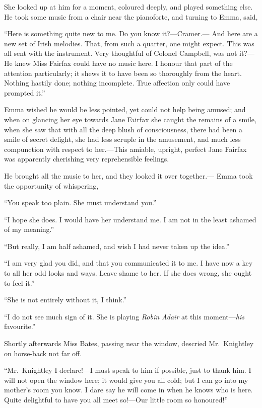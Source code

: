 She looked up at him for a moment, coloured deeply, and played
something else.  He took some music from a chair near the pianoforte,
and turning to Emma, said,

``Here is something quite new to me.  Do you know it?---Cramer.---%
And here are a new set of Irish melodies.  That, from such a quarter,
one might expect.  This was all sent with the instrument.  Very thoughtful
of Colonel Campbell, was not it?---He knew Miss Fairfax could have
no music here.  I honour that part of the attention particularly;
it shews it to have been so thoroughly from the heart.  Nothing hastily
done; nothing incomplete.  True affection only could have prompted it.''

Emma wished he would be less pointed, yet could not help being amused;
and when on glancing her eye towards Jane Fairfax she caught
the remains of a smile, when she saw that with all the deep blush
of consciousness, there had been a smile of secret delight,
she had less scruple in the amusement, and much less compunction
with respect to her.---This amiable, upright, perfect Jane Fairfax
was apparently cherishing very reprehensible feelings.

He brought all the music to her, and they looked it over together.---%
Emma took the opportunity of whispering,

``You speak too plain.  She must understand you.''

``I hope she does.  I would have her understand me.  I am not
in the least ashamed of my meaning.''

``But really, I am half ashamed, and wish I had never taken up
the idea.''

``I am very glad you did, and that you communicated it to me.
I have now a key to all her odd looks and ways.  Leave shame to her.
If she does wrong, she ought to feel it.''

``She is not entirely without it, I think.''

``I do not see much sign of it.  She is playing \emph{Robin Adair}
at this moment---\emph{his} favourite.''

Shortly afterwards Miss Bates, passing near the window,
descried Mr.\ Knightley on horse-back not far off.

``Mr.\ Knightley I declare!---I must speak to him if possible,
just to thank him.  I will not open the window here; it would give
you all cold; but I can go into my mother's room you know.  I dare
say he will come in when he knows who is here.  Quite delightful
to have you all meet so!---Our little room so honoured!''

